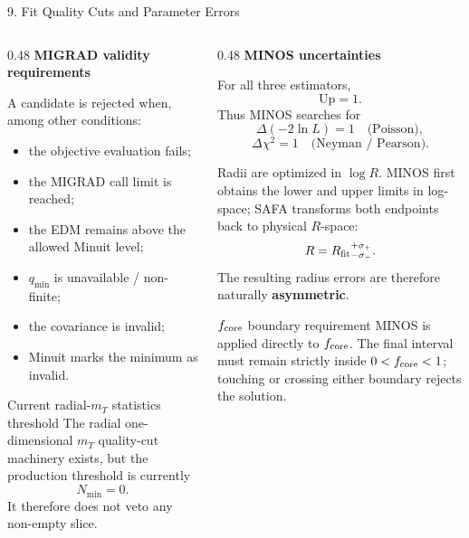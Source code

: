 \documentclass{beamer}
\begin{document}
\begin{frame}{9. Fit Quality Cuts and Parameter Errors}
\fontsize{6.2}{6.9}\selectfont

\begin{columns}[T]

\begin{column}{0.48\textwidth}
\textbf{MIGRAD validity requirements}

A candidate is rejected when, among other conditions:
\begin{itemize}
    \setlength{\itemsep}{0.15em}
    \item the objective evaluation fails;
    \item the MIGRAD call limit is reached;
    \item the EDM remains above the allowed Minuit level;
    \item $q_{\min}$ is unavailable / non-finite;
    \item the covariance is invalid;
    \item Minuit marks the minimum as invalid.
\end{itemize}

\begin{block}{Current radial-$m_T$ statistics threshold}
The radial one-dimensional $m_T$ quality-cut machinery exists, but the production threshold is currently
\[
N_{\min}=0.
\]
It therefore does not veto any non-empty slice.
\end{block}
\end{column}

\begin{column}{0.48\textwidth}
\textbf{MINOS uncertainties}

For all three estimators,
\[
\mathrm{Up}=1.
\]
Thus MINOS searches for
\[
\Delta(-2\ln L)=1 \quad \text{(Poisson)},
\]
\[
\Delta\chi^2=1 \quad \text{(Neyman / Pearson)}.
\]

Radii are optimized in $\log R$. MINOS first obtains the lower and upper limits in log-space; SAFA transforms both endpoints back to physical $R$-space:
\[
R=R_{\rm fit}{}^{+\sigma_+}_{-\sigma_-}.
\]
The resulting radius errors are therefore naturally \textbf{asymmetric}.

\begin{alertblock}{$f_{\rm core}$ boundary requirement}
MINOS is applied directly to $f_{\rm core}$. The final interval must remain strictly inside $0<f_{\rm core}<1$; touching or crossing either boundary rejects the solution.
\end{alertblock}
\end{column}

\end{columns}
\end{frame}
\end{document}
